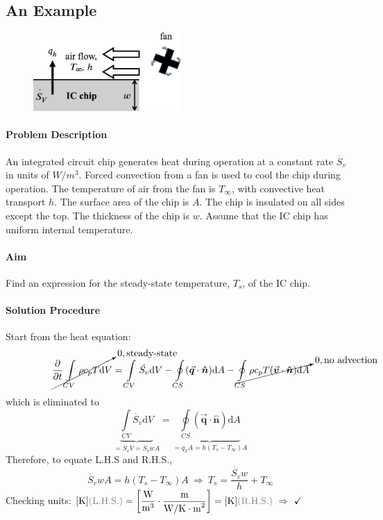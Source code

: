 \documentclass[12pt, a4paper]{article}
\numberwithin{equation}{subsection}
\begin{document}
\subsection{An Example}
\begin{tcolorbox}[breakable, title = \textbf{Example: Cooling of a Circuit Board}]
\begin{figure}[H]
    \centering
    \includegraphics[width=0.5\textwidth]{img/cooling_fan.eps}
\end{figure}
\paragraph{Problem Description} An integrated circuit chip generates heat during operation at a constant rate $\dot{S_{v}}$ in units of $W/m^{3}$. Forced convection from a fan is used to cool the chip during operation. The temperature of air from the fan is $T_{\infty}$, with convective heat transport $h$. The surface area of the chip is $A$. The chip is insulated on all sides except the top. The thickness of the chip is $w$. Assume that the IC chip has uniform internal temperature.

\paragraph{Aim} Find an expression for the steady-state temperature, $T_s$, of the IC chip.
\paragraph{Solution Procedure} Start from the heat equation:
\[ 
    \cancelto{0, \text{steady-state}}{\frac{\partial}{\partial t} \int\limits_{CV} \rho c_{p} T \mathrm{d}V} = \int\limits_{CV} \dot{S_{v}} \mathrm{d}V - \oint\limits_{CS} (\vec{\bm{q}} \cdot \bm{\hat{n}}) \mathrm{d}A - \cancelto{0,\text{no advection}}{\oint\limits_{CS} \rho c_{p} T (\vec{\bm{v}} \cdot \bm{\hat{n}}) \mathrm{d}A}
\]
which is eliminated to
\[ 
    \underbrace{\int\limits_{CV} \dot{S_{v}} \mathrm{d}V}_{= \dot{S_{v}} V = \dot{S_{v}} w A}
    = \underbrace{\oint\limits_{CS} (\vec{\bm{q}} \cdot \bm{\hat{n}}) \mathrm{d}A}_{= q_{h} A = h(T_{s}-T_{\infty}) A}
\]
Therefore, to equate L.H.S and R.H.S.,
\[ 
    \dot{S_{v}} w A = h(T_{s}-T_{\infty}) A \ \Rightarrow \  \boxed{T_{s} = \frac{\dot{S_{v}} w}{h}+T_{\infty}} 
\]
Checking units: 
$[\mathrm{K}] {\color{gray}(\text{L.H.S.})} = \bigg[ \dfrac{\mathrm{W}}{\mathrm{m}^{3}} \cdot \dfrac{\mathrm{m}}{\mathrm{W}/\mathrm{K \cdot m}^{2}} \bigg] = [\mathrm{K}] {\color{gray}(\text{R.H.S.})} \ \Rightarrow \ \checkmark$
\end{tcolorbox}
\end{document}
